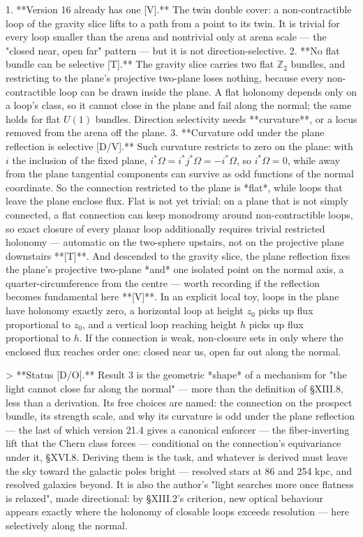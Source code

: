 1. **Version 16 already has one [V].** The twin double cover: a non-contractible loop of the gravity slice lifts to a path from a point to its twin. It is trivial for every loop smaller than the arena and nontrivial only at arena scale — the "closed near, open far" pattern — but it is not direction-selective.
2. **No flat bundle can be selective [T].** The gravity slice carries two flat $\mathbb Z_2$ bundles, and restricting to the plane's projective two-plane loses nothing, because every non-contractible loop can be drawn inside the plane. A flat holonomy depends only on a loop's class, so it cannot close in the plane and fail along the normal; the same holds for flat $U(1)$ bundles. Direction selectivity needs **curvature**, or a locus removed from the arena off the plane.
3. **Curvature odd under the plane reflection is selective [D/V].** Such curvature restricts to zero on the plane: with $i$ the inclusion of the fixed plane, $i^*\Omega = i^*j^*\Omega = -i^*\Omega$, so $i^*\Omega = 0$, while away from the plane tangential components can survive as odd functions of the normal coordinate. So the connection restricted to the plane is *flat*, while loops that leave the plane enclose flux. Flat is not yet trivial: on a plane that is not simply connected, a flat connection can keep monodromy around non-contractible loops, so exact closure of every planar loop additionally requires trivial restricted holonomy — automatic on the two-sphere upstairs, not on the projective plane downstairs **[T]**. And descended to the gravity slice, the plane reflection fixes the plane's projective two-plane *and* one isolated point on the normal axis, a quarter-circumference from the centre — worth recording if the reflection becomes fundamental here **[V]**. In an explicit local toy, loops in the plane have holonomy exactly zero, a horizontal loop at height $z_0$ picks up flux proportional to $z_0$, and a vertical loop reaching height $h$ picks up flux proportional to $h$. If the connection is weak, non-closure sets in only where the enclosed flux reaches order one: closed near us, open far out along the normal.

> **Status [D/O].** Result 3 is the geometric *shape* of a mechanism for "the light cannot close far along the normal" — more than the definition of §XIII.8, less than a derivation. Its free choices are named: the connection on the prospect bundle, its strength scale, and why its curvature is odd under the plane reflection — the last of which version 21.4 gives a canonical enforcer — the fiber-inverting lift that the Chern class forces — conditional on the connection's equivariance under it, §XVI.8. Deriving them is the task, and whatever is derived must leave the sky toward the galactic poles bright — resolved stars at 86 and 254 kpc, and resolved galaxies beyond. It is also the author's "light searches more once flatness is relaxed", made directional: by §XIII.2's criterion, new optical behaviour appears exactly where the holonomy of closable loops exceeds resolution — here selectively along the normal.

